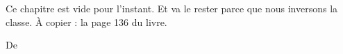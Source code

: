 

Ce chapitre est vide pour l'instant. Et va le rester parce que nous inversons la classe. À copier : la page 136 du livre.



De \cite{NRHooXFvgpp4}



